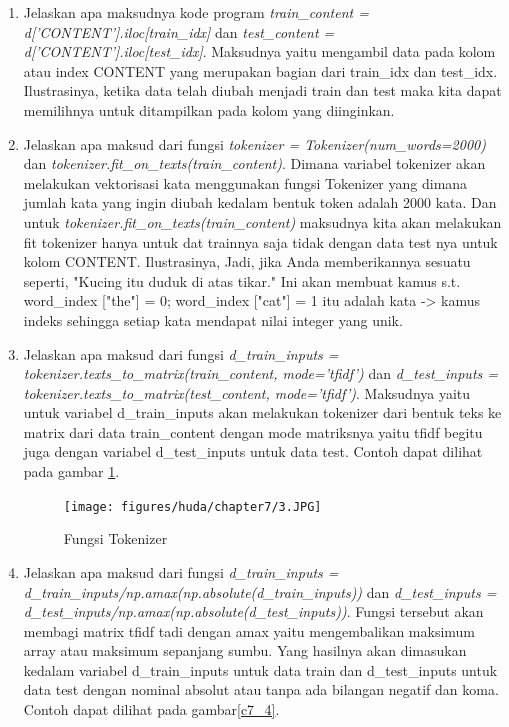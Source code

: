 \begin{enumerate}
\item Jelaskan apa maksudnya kode program \emph{train\_content = d['CONTENT'].iloc[train\_idx]} dan \emph{test\_content = d['CONTENT'].iloc[test\_idx]}.
\subitem Maksudnya yaitu mengambil data pada kolom atau index CONTENT yang merupakan bagian dari train\_idx dan test\_idx. Ilustrasinya, ketika data telah diubah menjadi train dan test maka kita dapat memilihnya untuk ditampilkan pada kolom yang diinginkan.
\item Jelaskan apa maksud dari fungsi \emph{tokenizer = Tokenizer(num\_words=2000)} dan \emph{tokenizer.fit\_on\_texts(train\_content)}.
\subitem Dimana variabel tokenizer akan melakukan vektorisasi kata menggunakan fungsi Tokenizer yang dimana jumlah kata yang ingin diubah kedalam bentuk token adalah 2000 kata. Dan untuk \emph{tokenizer.fit\_on\_texts(train\_content)} maksudnya kita akan melakukan fit tokenizer hanya untuk dat trainnya saja tidak dengan data test nya untuk kolom CONTENT. Ilustrasinya, Jadi, jika Anda memberikannya sesuatu seperti, "Kucing itu duduk di atas tikar." Ini akan membuat kamus s.t. word\_index ["the"] = 0; word\_index ["cat"] = 1 itu adalah kata -> kamus indeks sehingga setiap kata mendapat nilai integer yang unik.
\item Jelaskan apa maksud dari fungsi \emph{d\_train\_inputs = tokenizer.texts\_to\_matrix(train\_content, mode='tfidf')} dan \emph{d\_test\_inputs = tokenizer.texts\_to\_matrix(test\_content, mode='tfidf')}.
\subitem Maksudnya yaitu untuk variabel d\_train\_inputs akan melakukan tokenizer dari bentuk teks ke matrix dari data train\_content dengan mode matriksnya yaitu tfidf begitu juga dengan variabel d\_test\_inputs untuk data test. Contoh dapat dilihat pada gambar \ref{c7_3}.
\begin{figure}[!htbp]
	\centerline{\texttt{[image: figures/huda/chapter7/3.JPG]}}
	\caption{Fungsi Tokenizer}
	\label{c7_3}
\end{figure}
\item Jelaskan apa maksud dari fungsi \emph{d\_train\_inputs = d\_train\_inputs/np.amax(np.absolute(d\_train\_inputs))} dan \emph{d\_test\_inputs = d\_test\_inputs/np.amax(np.absolute(d\_test\_inputs))}.
\subitem Fungsi tersebut akan membagi matrix tfidf tadi dengan amax yaitu mengembalikan maksimum array atau maksimum sepanjang sumbu. Yang hasilnya akan dimasukan kedalam variabel d\_train\_inputs untuk data train dan d\_test\_inputs untuk data test dengan nominal absolut atau tanpa ada bilangan negatif dan koma. Contoh dapat dilihat pada gambar\ref{c7_4}.
\begin{figure}[!htbp]

\end{figure}
\end{enumerate}
